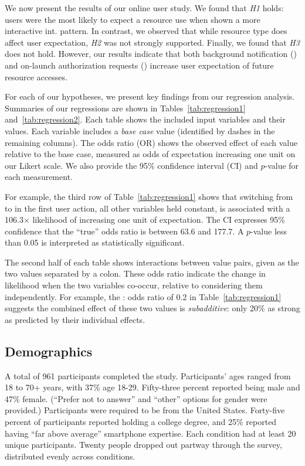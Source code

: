 We now present the results of our online user study.  We found that
\emph{H1} holds: users were the most likely to expect a resource use
when shown a more interactive int. pattern. In contrast, we observed 
that while resource type does affect user expectation, \emph{H2} 
was not strongly supported. 
Finally, we found that \emph{H3} does not hold. However, our results 
indicate that both background notification (\backgroundnotify{}) and 
on-launch authorization requests (\launch{}) increase user expectation 
of future resource accesses. 

For each of our hypotheses, we present
key findings from our regression analysis.  Summaries of our regressions are shown in 
Tables~\ref{tab:regression1} and~\ref{tab:regression2}. Each table shows the included 
input variables and their values. Each variable includes a \emph{base
  case} value (identified by dashes in the remaining columns).
The odds 
ratio (OR) shows the observed effect of each value relative to the base case, measured as odds 
of expectation increasing one unit on our Likert scale. We also provide the 95\% confidence 
interval (CI) and $p$-value for each measurement. 

For example, the third row of Table~\ref{tab:regression1} shows that switching from \backgroundonly{}
to \interactive{} in the first user action, all other variables held constant, is associated 
with a 106.3$\times$ likelihood of increasing one unit of expectation. The CI expresses 95\% confidence 
that the ``true'' odds ratio is between 63.6 and 177.7. A $p$-value less than 0.05 is interpreted as 
statistically significant. 

The second 
half of each table shows interactions between value pairs, given as the two values 
separated by a colon. These odds ratio indicate the 
change in likelihood when the two variables co-occur, relative to considering them independently. For 
example, the \location{}:\interactive{} odds ratio of 0.2 in Table~\ref{tab:regression1} suggests the combined effect of 
these two values is \emph{subadditive}: only 20\% 
as strong as predicted by their individual effects.

\subsection{Demographics}
A total of 961 participants completed the study. Participants' ages ranged from 18 to 70+ years, with  
37\% age 18-29. Fifty-three percent reported being male and 47\% female. (``Prefer not to answer''
and ``other'' options for gender were provided.) Participants were required to be from the United States. Forty-five 
percent of participants reported holding a college degree, and 25\%
reported having ``far above average'' smartphone expertise.
Each condition had at least 20 unique participants. Twenty people dropped out partway through the survey, 
distributed evenly across conditions. 


